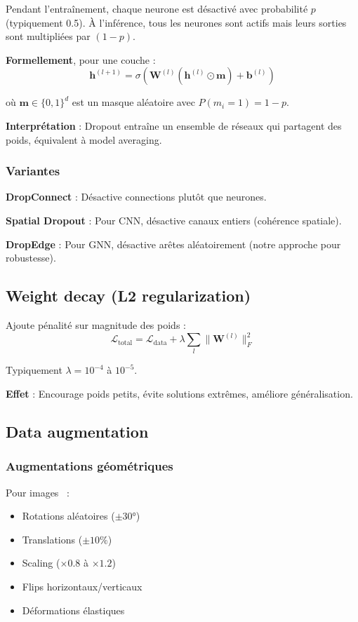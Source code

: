 Pendant l'entraînement, chaque neurone est désactivé avec probabilité $p$ (typiquement 0.5). À l'inférence, tous les neurones sont actifs mais leurs sorties sont multipliées par $(1-p)$.

\textbf{Formellement}, pour une couche :
\[
\mathbf{h}^{(l+1)} = \sigma\left(\mathbf{W}^{(l)} (\mathbf{h}^{(l)} \odot \mathbf{m}) + \mathbf{b}^{(l)}\right)
\]

où $\mathbf{m} \in \{0, 1\}^{d}$ est un masque aléatoire avec $P(m_i = 1) = 1-p$.

\textbf{Interprétation} : Dropout entraîne un ensemble de réseaux qui partagent des poids, équivalent à model averaging.

\subsubsection{Variantes}

\textbf{DropConnect} : Désactive connections plutôt que neurones.

\textbf{Spatial Dropout} : Pour CNN, désactive canaux entiers (cohérence spatiale).

\textbf{DropEdge} : Pour GNN, désactive arêtes aléatoirement (notre approche pour robustesse).

\subsection{Weight decay (L2 regularization)}

Ajoute pénalité sur magnitude des poids :
\[
\mathcal{L}_{\text{total}} = \mathcal{L}_{\text{data}} + \lambda \sum_l \|\mathbf{W}^{(l)}\|_F^2
\]

Typiquement $\lambda = 10^{-4}$ à $10^{-5}$.

\textbf{Effet} : Encourage poids petits, évite solutions extrêmes, améliore généralisation.

\subsection{Data augmentation}

\subsubsection{Augmentations géométriques}

Pour images~\cite{Shorten2019} :
\begin{itemize}
    \item Rotations aléatoires ($\pm 30°$)
    \item Translations ($\pm 10\%$)
    \item Scaling ($\times 0.8$ à $\times 1.2$)
    \item Flips horizontaux/verticaux
    \item Déformations élastiques
\end{itemize}

